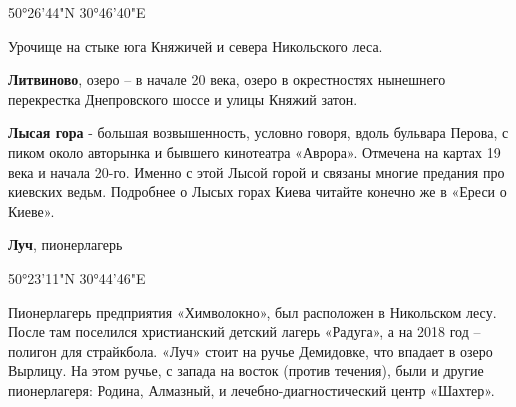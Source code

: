 50°26'44"N 30°46'40"E

Урочище на стыке юга Княжичей и севера Никольского леса.\\

\medskip

\textbf{Литвиново}, озеро – в начале 20 века, озеро в окрестностях нынешнего перекрестка Днепровского шоссе и улицы Княжий затон.\\

\medskip

\textbf{Лысая гора} - большая возвышенность, условно говоря, вдоль бульвара Перова, с пиком около авторынка и бывшего кинотеатра «Аврора». Отмечена на картах 19 века и начала 20-го. Именно с этой Лысой горой и связаны многие предания про киевских ведьм. Подробнее о Лысых горах Киева читайте конечно же в «Ереси о Киеве».\\

\medskip

\textbf{Луч}, пионерлагерь

50°23'11"N 30°44'46"E

Пионерлагерь предприятия «Химволокно», был расположен в Никольском лесу. После там поселился христианский детский лагерь «Радуга», а на 2018 год – полигон для страйкбола. «Луч» стоит на ручье Демидовке, что впадает в озеро Вырлицу. На этом ручье, с запада на восток (против течения), были и другие пионерлагеря: Родина, Алмазный, и лечебно-диагностический центр «Шахтер».
